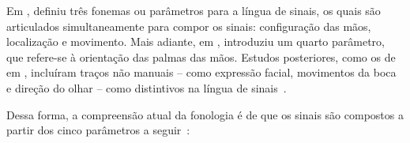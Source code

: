 

Em \citeyear{stokoe-1960-sl-structure}, \citeauthor{stokoe-1960-sl-structure} definiu três fonemas ou parâmetros para a língua de sinais, os quais são articulados simultaneamente para compor os sinais: configuração das mãos, localização e movimento. Mais adiante, em \citeyear{battison-1974-phono-deletion}, \citeauthor{battison-1974-phono-deletion} introduziu um quarto parâmetro, que refere-se à orientação das palmas das mãos. Estudos posteriores, como os de \citeauthor{baker-padden-1978-nonmanual-components} em \citeyear{baker-padden-1978-nonmanual-components}, incluíram traços não manuais -- como expressão facial, movimentos da boca e direção do olhar -- como distintivos na língua de sinais~\cite{stokoe-1960-sl-structure,battison-1974-phono-deletion,baker-padden-1978-nonmanual-components}.


Dessa forma, a compreensão atual da fonologia é de que os sinais são compostos a partir dos cinco parâmetros a seguir~\cite{stewart-2021-barrons-asl,jay-2011-dont-just-sign,quadros-2004-estudos-linguisticos}:

